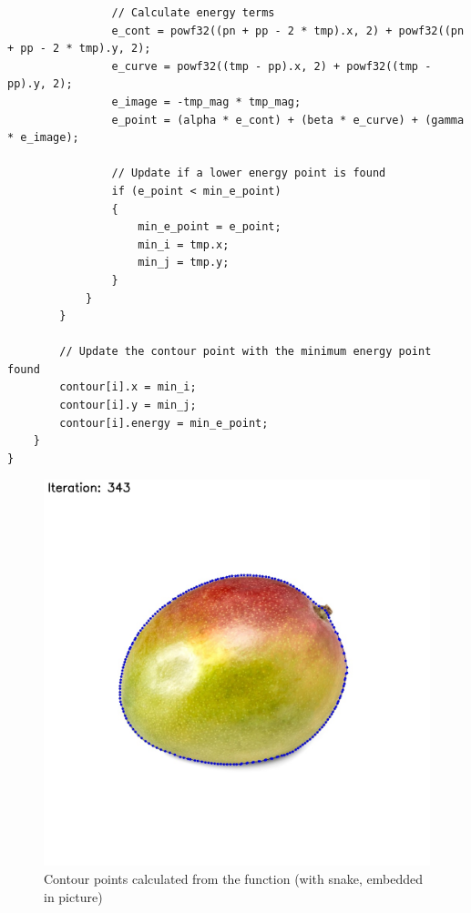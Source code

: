 \documentclass[12pt,a4paper]{report}
\begin{document}
\begin{lstlisting}
                // Calculate energy terms
                e_cont = powf32((pn + pp - 2 * tmp).x, 2) + powf32((pn + pp - 2 * tmp).y, 2);
                e_curve = powf32((tmp - pp).x, 2) + powf32((tmp - pp).y, 2);
                e_image = -tmp_mag * tmp_mag;
                e_point = (alpha * e_cont) + (beta * e_curve) + (gamma * e_image);

                // Update if a lower energy point is found
                if (e_point < min_e_point)
                {
                    min_e_point = e_point;
                    min_i = tmp.x;
                    min_j = tmp.y;
                }
            }
        }

        // Update the contour point with the minimum energy point found
        contour[i].x = min_i;
        contour[i].y = min_j;
        contour[i].energy = min_e_point;
    }
}
\end{lstlisting}
\begin{figure}[!htb]
    \centering
      \includegraphics[height=0.4\paperheight]{output/result_img1.jpg}
    \caption{Contour points calculated from the function (with snake, embedded in picture)}
\end{figure}
\clearpage
\end{document}
